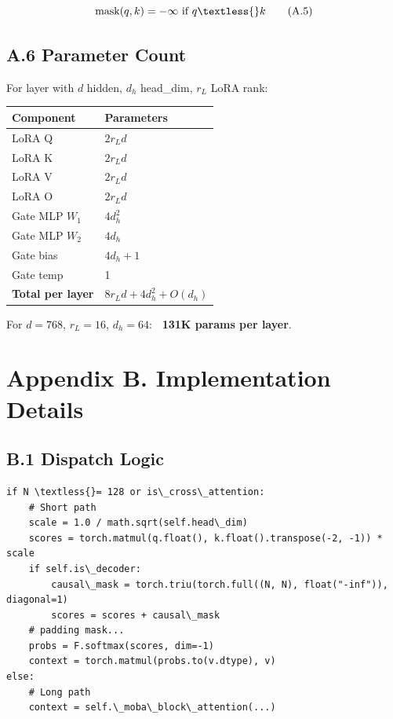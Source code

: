 \[
\text{mask}(q, k) = -\infty \text{ if } q \textless{} k
\tag{A.5}
\]

\subsection{A.6 Parameter Count}

For layer with $d$ hidden, $d_h$ head\_dim, $r_L$ LoRA rank:

\begin{table}[H]
\centering
\small
\begin{tabular}{ll}
\toprule
\textbf{Component} & \textbf{Parameters} \\
\midrule
LoRA Q & $2 r_L d$ \\
LoRA K & $2 r_L d$ \\
LoRA V & $2 r_L d$ \\
LoRA O & $2 r_L d$ \\
Gate MLP $W_1$ & $4 d_h^2$ \\
Gate MLP $W_2$ & $4 d_h$ \\
Gate bias & $4 d_h + 1$ \\
Gate temp & 1 \\
\textbf{Total per layer} & $8 r_L d + 4 d_h^2 + O(d_h)$ \\
\bottomrule
\end{tabular}
\end{table}

For $d = 768$, $r_L = 16$, $d_h = 64$: \textbf{~131K params per layer}.



\section{Appendix B. Implementation Details}

\subsection{B.1 Dispatch Logic}

\begin{lstlisting}
if N \textless{}= 128 or is\_cross\_attention:
    # Short path
    scale = 1.0 / math.sqrt(self.head\_dim)
    scores = torch.matmul(q.float(), k.float().transpose(-2, -1)) * scale
    if self.is\_decoder:
        causal\_mask = torch.triu(torch.full((N, N), float("-inf")), diagonal=1)
        scores = scores + causal\_mask
    # padding mask...
    probs = F.softmax(scores, dim=-1)
    context = torch.matmul(probs.to(v.dtype), v)
else:
    # Long path
    context = self.\_moba\_block\_attention(...)
\end{lstlisting}

